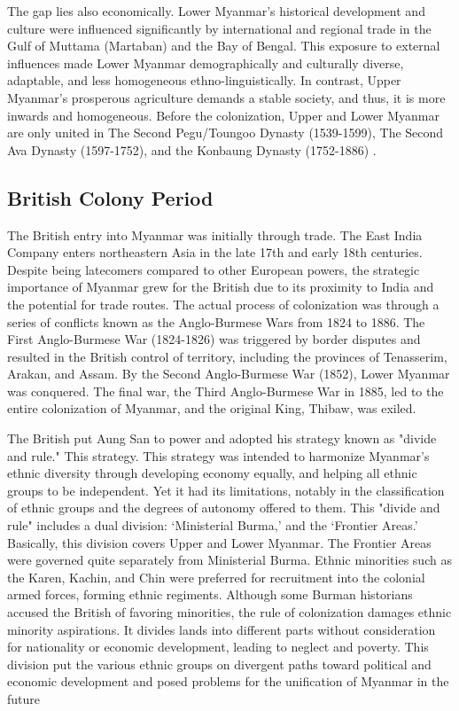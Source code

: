\documentclass[man,floatsintext]{apa7}
\begin{document}
The gap lies also economically. Lower Myanmar's historical development and culture were influenced significantly by international and regional trade in the Gulf of Muttama (Martaban) and the Bay of Bengal. This exposure to external influences made Lower Myanmar demographically and culturally diverse, adaptable, and less homogeneous ethno-linguistically. In contrast, Upper Myanmar's prosperous agriculture demands a stable society, and thus, it is more inwards and homogeneous. Before the colonization, Upper and Lower Myanmar are only united in The Second Pegu/Toungoo Dynasty (1539-1599), The Second Ava Dynasty (1597-1752), and the Konbaung Dynasty (1752-1886) \autocite[33,44,130]{aung-thwinHistoryMyanmarAncient2012}.

\subsection{British Colony Period}

The British entry into Myanmar was initially through trade. The East India Company enters northeastern Asia in the late 17th and early 18th centuries. Despite being latecomers compared to other European powers, the strategic importance of Myanmar grew for the British due to its proximity to India and the potential for trade routes. The actual process of colonization was through a series of conflicts known as the Anglo-Burmese Wars from 1824 to 1886. The First Anglo-Burmese War (1824-1826) was triggered by border disputes and resulted in the British control of territory, including the provinces of Tenasserim, Arakan, and Assam. By the Second Anglo-Burmese War (1852), Lower Myanmar was conquered. The final war, the Third Anglo-Burmese War in 1885, led to the entire colonization of Myanmar, and the original King, Thibaw, was exiled. \autocite[174-194]{aung-thwinHistoryMyanmarAncient2012}

The British put Aung San to power and adopted his strategy known as "divide and rule." This strategy. This strategy was intended to harmonize Myanmar's ethnic diversity through developing economy equally, and helping all ethnic groups to be independent. Yet it had its limitations, notably in the classification of ethnic groups and the degrees of autonomy offered to them. This "divide and rule" includes a dual division: `Ministerial Burma,' and the `Frontier Areas.' Basically, this division covers Upper and Lower Myanmar. The Frontier Areas were governed quite separately from Ministerial Burma. Ethnic minorities such as the Karen, Kachin, and Chin were preferred for recruitment into the colonial armed forces, forming ethnic regiments. Although some Burman historians accused the British of favoring minorities, the rule of colonization damages ethnic minority aspirations. It divides lands into different parts without consideration for nationality or economic development, leading to neglect and poverty. This division put the various ethnic groups on divergent paths toward political and economic development and posed problems for the unification of Myanmar in the future \autocite[18-23]{smithEthnicGroupsBurma1994}
\end{document}
